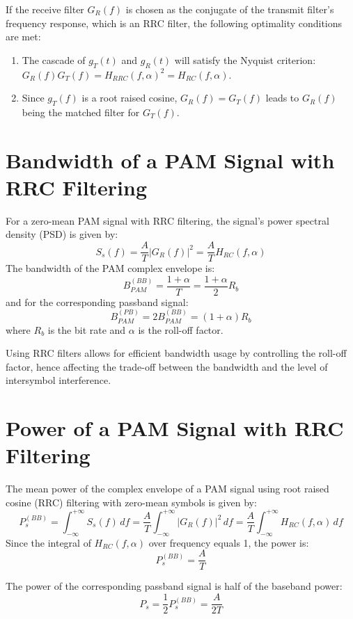If the receive filter \( G_R(f) \) is chosen as the conjugate of the transmit filter's frequency response, which is an RRC filter, the following optimality conditions are met:
\begin{enumerate}
    \item The cascade of \( g_T(t) \) and \( g_R(t) \) will satisfy the Nyquist criterion: \( G_R(f)G_T(f) = H_{RRC}(f, \alpha)^2 = H_{RC}(f, \alpha) \).
    \item Since \( g_T(f) \) is a root raised cosine, \( G_R(f) = G_T(f) \) leads to \( G_R(f) \) being the matched filter for \( G_T(f) \).
\end{enumerate}

\section*{Bandwidth of a PAM Signal with RRC Filtering}

For a zero-mean PAM signal with RRC filtering, the signal's power spectral density (PSD) is given by:
\[ S_s(f) = \frac{A}{T} |G_R(f)|^2 = \frac{A}{T} H_{RC}(f, \alpha) \]
The bandwidth of the PAM complex envelope is:
\[ B_{PAM}^{(BB)} = \frac{1 + \alpha}{T} = \frac{1 + \alpha}{2} R_b \]
and for the corresponding passband signal:
\[ B_{PAM}^{(PB)} = 2 B_{PAM}^{(BB)} = (1 + \alpha) R_b \]
where \( R_b \) is the bit rate and \( \alpha \) is the roll-off factor.

Using RRC filters allows for efficient bandwidth usage by controlling the roll-off factor, hence affecting the trade-off between the bandwidth and the level of intersymbol interference.


\section*{Power of a PAM Signal with RRC Filtering}

The mean power of the complex envelope of a PAM signal using root raised cosine (RRC) filtering with zero-mean symbols is given by:
\[ P_s^{(BB)} = \int_{-\infty}^{+\infty} S_s(f) \, df = \frac{A}{T} \int_{-\infty}^{+\infty} |G_R(f)|^2 \, df = \frac{A}{T} \int_{-\infty}^{+\infty} H_{RC}(f, \alpha) \, df \]
Since the integral of \( H_{RC}(f, \alpha) \) over frequency equals 1, the power is:
\[ P_s^{(BB)} = \frac{A}{T} \]

The power of the corresponding passband signal is half of the baseband power:
\[ P_s = \frac{1}{2} P_s^{(BB)} = \frac{A}{2T} \]

